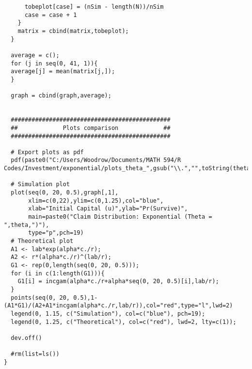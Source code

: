 \documentclass[12pt]{article}
\begin{document}
\begin{lstlisting}
      tobeplot[case] = (nSim - length(N))/nSim
      case = case + 1
    }
    matrix = cbind(matrix,tobeplot);
  }
  
  average = c();
  for (j in seq(0, 41, 1)){
  average[j] = mean(matrix[j,]);
  }
  
  graph = cbind(graph,average);
  
  
  ##############################################
  ##             Plots comparison             ##
  ##############################################
  
  # Export plots as pdf
  pdf(paste0("C:/Users/Woodrow/Documents/MATH 594/R Codes/Investment/exponential/plots_theta_",gsub("\\.","",toString(theta)),".pdf"))
  
  # Simulation plot
  plot(seq(0, 20, 0.5),graph[,1],
       xlim=c(0,22),ylim=c(0,1.25),col="blue",
       xlab="Initial Capital (u)",ylab="Pr(Survive)",
       main=paste0("Claim Distribution: Exponential (Theta = ",theta,")"),
       type="p",pch=19)
  # Theoretical plot
  A1 <- lab*exp(alpha*c./r);
  A2 <- r*(alpha*c./r)^(lab/r);
  G1 <- rep(0,length(seq(0, 20, 0.5)));
  for (i in c(1:length(G1))){
    G1[i] = incgam(alpha*c./r+alpha*seq(0, 20, 0.5)[i],lab/r);
  }
  points(seq(0, 20, 0.5),1-(A1*G1)/(A2+A1*incgam(alpha*c./r,lab/r)),col="red",type="l",lwd=2)
  legend(0, 1.15, c("Simulation"), col=c("blue"), pch=19);
  legend(0, 1.25, c("Theoretical"), col=c("red"), lwd=2, lty=c(1));
  
  dev.off()
  
  #rm(list=ls())
}
\end{lstlisting}
\end{document}
